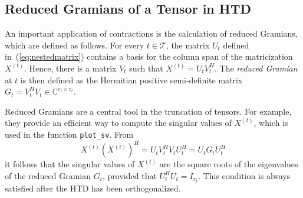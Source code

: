 \documentclass[11pt, a4paper]{article}
\newcommand{\calT}{\mathcal{T}}
\newcommand{\C}{{\mathbb C}}
\begin{document}
\subsection{Reduced Gramians of a Tensor in HTD} \label{sec:reducedgramians}

An important application of contractions is the calculation of reduced Gramians, which
are defined as follows.
For every $t \in \calT$, the matrix $U_t$ defined in~(\ref{eq:nestedmatrix})
contains a basis for the column span of the matricization $X^{(t)}$. Hence,
there is a matrix $V_t$ such that $X^{(t)} = U_t V_t^H$. 
The \emph{reduced Gramian} at $t$ is then defined as the
Hermitian positive semi-definite matrix $G_t = V_t^H V_t \in \C^{r_t\times r_t}$.

Reduced Gramians are a central tool in the truncation
of tensors. For example, they provide an efficient way to compute
the singular values of $X^{(t)}$, which is used in the function {\tt plot\_sv}.
From
\begin{equation} \label{eq:matrixgramian}
 X^{(t)} (X^{(t)})^H = U_t V_t^H V_t U_t^H = U_t G_t U_t^H
\end{equation}
it follows that the singular values of $X^{(t)}$ are the square roots of the eigenvalues 
of the reduced Gramian $G_t$, provided that $U_t^H U_t = I_{r_t}$. This condition is always satisfied after
the HTD has been orthogonalized.
\end{document}
